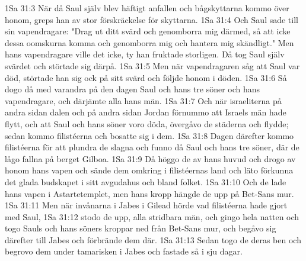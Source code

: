 1Sa 31:3  När då Saul själv blev häftigt anfallen och bågskyttarna kommo över honom, greps han av stor förskräckelse för skyttarna.
1Sa 31:4  Och Saul sade till sin vapendragare: "Drag ut ditt svärd och genomborra mig därmed, så att icke dessa oomskurna komma och genomborra mig och hantera mig skändligt." Men hans vapendragare ville det icke, ty han fruktade storligen. Då tog Saul själv svärdet och störtade sig därpå.
1Sa 31:5  Men när vapendragaren såg att Saul var död, störtade han sig ock på sitt svärd och följde honom i döden.
1Sa 31:6  Så dogo då med varandra på den dagen Saul och hans tre söner och hans vapendragare, och därjämte alla hans män.
1Sa 31:7  Och när israeliterna på andra sidan dalen och på andra sidan Jordan förnummo att Israels män hade flytt, och att Saul och hans söner voro döda, övergåvo de städerna och flydde; sedan kommo filistéerna och bosatte sig i dem.
1Sa 31:8  Dagen därefter kommo filistéerna för att plundra de slagna och funno då Saul och hans tre söner, där de lågo fallna på berget Gilboa.
1Sa 31:9  Då höggo de av hans huvud och drogo av honom hans vapen och sände dem omkring i filistéernas land och läto förkunna det glada budskapet i sitt avgudahus och bland folket.
1Sa 31:10  Och de lade hans vapen i Astartetemplet, men hans kropp hängde de upp på Bet-Sans mur.
1Sa 31:11  Men när invånarna i Jabes i Gilead hörde vad filistéerna hade gjort med Saul,
1Sa 31:12  stodo de upp, alla stridbara män, och gingo hela natten och togo Sauls och hans söners kroppar ned från Bet-Sans mur, och begåvo sig därefter till Jabes och förbrände dem där.
1Sa 31:13  Sedan togo de deras ben och begrovo dem under tamarisken i Jabes och fastade så i sju dagar.


